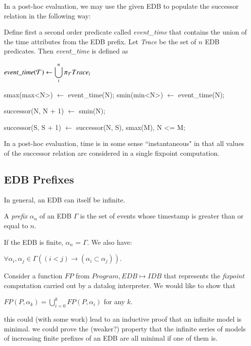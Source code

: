 In a post-hoc evaluation, we may use the given EDB to populate the successor relation in the following way:

Define first a second order predicate called \emph{event\_time} 
that contains the union of the time attributes from the EDB prefix. Let \emph{Trace} be the set of $n$ EDB predicates.  
Then \emph{event\_time} is defined as

$event\_time(\Tau) \leftarrow \displaystyle\bigcup_{i}^n \pi_{\Tau}Trace_{i}$

\begin{Dedalus}
smax(max<N>) \(\leftarrow\) event\_time(N);
smin(min<N>) \(\leftarrow\) event\_time(N);

successor(N, N + 1) \(\leftarrow\) smin(N);

successor(S, S + 1) \(\leftarrow\) 
    successor(N, S),
    smax(M),
    N <= M;
\end{Dedalus}

In a post-hoc evaluation, time is in some sense ``instantaneous" in that all values of the successor relation are considered in a single
fixpoint computation.  

\subsection{EDB Prefixes}

In general, an EDB can itself be infinite. 

\begin{definition}
A \emph{prefix} $\alpha_{n}$ of an EDB $\Gamma$ is the set of events whose timestamp is greater than or equal to $n$.
\end{definition}

If the EDB is finite, $\alpha_{n}$ = $\Gamma$.  We also have:

$\forall \alpha_{i}, \alpha_{j} \in \Gamma ((i < j) \to (\alpha_{i} \subset \alpha_{j}))$.

Consider a function $FP$ from $Program, EDB \mapsto IDB$ that represents the \emph{fixpoint} computation carried out by a datalog interpreter.
We would like to show that 

$FP(P, \alpha_{k}) =  \displaystyle \bigcup_{i=0}^{k} FP(P, \alpha_{i})$ for any $k$.  

this could (with some work) lead to an inductive proof
that an infinite model is minimal.  we could prove the (weaker?) property that
the infinite series of models of increasing finite prefixes of an EDB are all 
minimal if one of them is.

